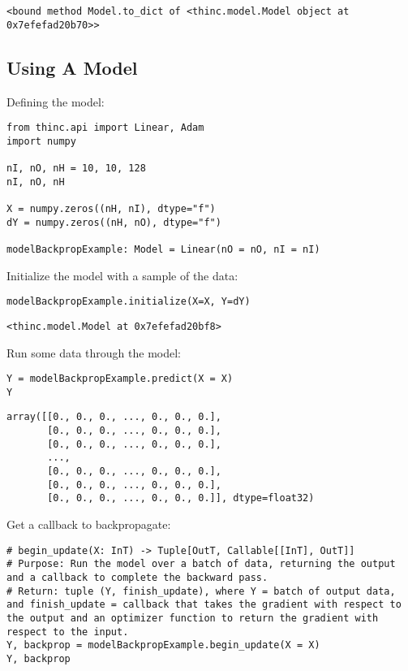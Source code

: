 \documentclass[
]{article}
\begin{document}
\begin{verbatim}
<bound method Model.to_dict of <thinc.model.Model object at 0x7efefad20b70>>
\end{verbatim}

\hypertarget{using-a-model}{%
\subsection{Using A Model}\label{using-a-model}}

Defining the model:

\begin{verbatim}
from thinc.api import Linear, Adam
import numpy

nI, nO, nH = 10, 10, 128
nI, nO, nH

X = numpy.zeros((nH, nI), dtype="f")
dY = numpy.zeros((nH, nO), dtype="f")

modelBackpropExample: Model = Linear(nO = nO, nI = nI)
\end{verbatim}

Initialize the model with a sample of the data:

\begin{verbatim}
modelBackpropExample.initialize(X=X, Y=dY)
\end{verbatim}

\begin{verbatim}
<thinc.model.Model at 0x7efefad20bf8>
\end{verbatim}

Run some data through the model:

\begin{verbatim}
Y = modelBackpropExample.predict(X = X)
Y
\end{verbatim}

\begin{verbatim}
array([[0., 0., 0., ..., 0., 0., 0.],
       [0., 0., 0., ..., 0., 0., 0.],
       [0., 0., 0., ..., 0., 0., 0.],
       ...,
       [0., 0., 0., ..., 0., 0., 0.],
       [0., 0., 0., ..., 0., 0., 0.],
       [0., 0., 0., ..., 0., 0., 0.]], dtype=float32)
\end{verbatim}

Get a callback to backpropagate:

\begin{verbatim}
# begin_update(X: InT) -> Tuple[OutT, Callable[[InT], OutT]]
# Purpose: Run the model over a batch of data, returning the output and a callback to complete the backward pass.
# Return: tuple (Y, finish_update), where Y = batch of output data, and finish_update = callback that takes the gradient with respect to the output and an optimizer function to return the gradient with respect to the input.
Y, backprop = modelBackpropExample.begin_update(X = X)
Y, backprop
\end{verbatim}
\end{document}

